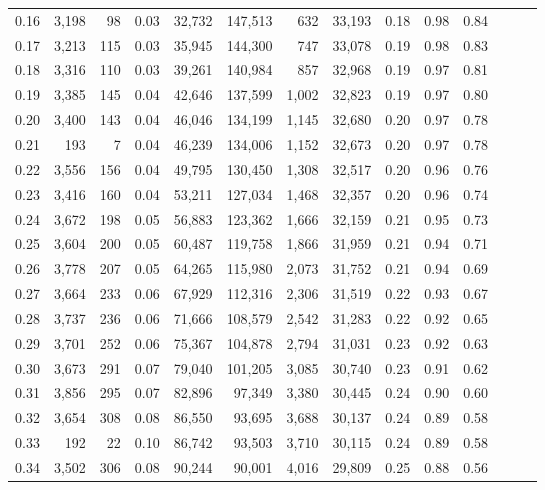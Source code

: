 \begin{tabular}{rrrrrrrrrrrrrr}
0.16 &  3,198 &   98 &  0.03 &   32,732 &  147,513 &     632 &  33,193 &  0.18 &  0.98 &      0.84 \\
0.17 &  3,213 &  115 &  0.03 &   35,945 &  144,300 &     747 &  33,078 &  0.19 &  0.98 &      0.83 \\
0.18 &  3,316 &  110 &  0.03 &   39,261 &  140,984 &     857 &  32,968 &  0.19 &  0.97 &      0.81 \\
0.19 &  3,385 &  145 &  0.04 &   42,646 &  137,599 &   1,002 &  32,823 &  0.19 &  0.97 &      0.80 \\
0.20 &  3,400 &  143 &  0.04 &   46,046 &  134,199 &   1,145 &  32,680 &  0.20 &  0.97 &      0.78 \\
0.21 &    193 &    7 &  0.04 &   46,239 &  134,006 &   1,152 &  32,673 &  0.20 &  0.97 &      0.78 \\
0.22 &  3,556 &  156 &  0.04 &   49,795 &  130,450 &   1,308 &  32,517 &  0.20 &  0.96 &      0.76 \\
0.23 &  3,416 &  160 &  0.04 &   53,211 &  127,034 &   1,468 &  32,357 &  0.20 &  0.96 &      0.74 \\
0.24 &  3,672 &  198 &  0.05 &   56,883 &  123,362 &   1,666 &  32,159 &  0.21 &  0.95 &      0.73 \\
0.25 &  3,604 &  200 &  0.05 &   60,487 &  119,758 &   1,866 &  31,959 &  0.21 &  0.94 &      0.71 \\
0.26 &  3,778 &  207 &  0.05 &   64,265 &  115,980 &   2,073 &  31,752 &  0.21 &  0.94 &      0.69 \\
0.27 &  3,664 &  233 &  0.06 &   67,929 &  112,316 &   2,306 &  31,519 &  0.22 &  0.93 &      0.67 \\
0.28 &  3,737 &  236 &  0.06 &   71,666 &  108,579 &   2,542 &  31,283 &  0.22 &  0.92 &      0.65 \\
0.29 &  3,701 &  252 &  0.06 &   75,367 &  104,878 &   2,794 &  31,031 &  0.23 &  0.92 &      0.63 \\
0.30 &  3,673 &  291 &  0.07 &   79,040 &  101,205 &   3,085 &  30,740 &  0.23 &  0.91 &      0.62 \\
0.31 &  3,856 &  295 &  0.07 &   82,896 &   97,349 &   3,380 &  30,445 &  0.24 &  0.90 &      0.60 \\
0.32 &  3,654 &  308 &  0.08 &   86,550 &   93,695 &   3,688 &  30,137 &  0.24 &  0.89 &      0.58 \\
0.33 &    192 &   22 &  0.10 &   86,742 &   93,503 &   3,710 &  30,115 &  0.24 &  0.89 &      0.58 \\
0.34 &  3,502 &  306 &  0.08 &   90,244 &   90,001 &   4,016 &  29,809 &  0.25 &  0.88 &      0.56 \\

\end{tabular}
